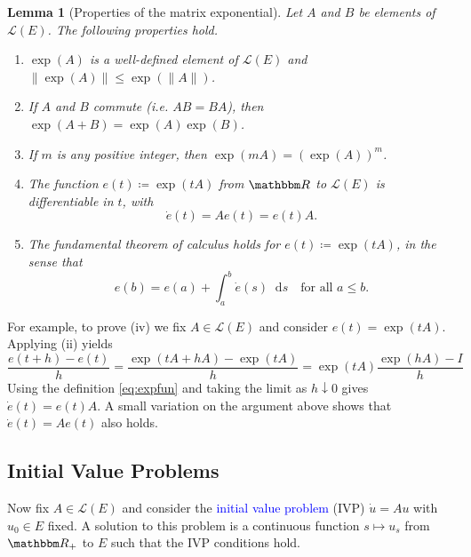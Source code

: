 \documentclass[12pt, reqno]{amsart}
\renewcommand{\leq}{\leqslant}
\newcommand{\1}{\mathbbm 1}
\newcommand*\diff{\mathop{}\!\mathrm{d}}
\newcommand{\lL}{\mathcal L}
\newcommand{\RR}{\mathbbm R}
\theoremstyle{plain}
\newtheorem{lemma}[theorem]{Lemma}
\theoremstyle{definition}
\newcommand{\navy}[1]{\textcolor{blue}{#1}}
\begin{document}
\begin{lemma}[Properties of the matrix exponential]\label{l:expcom}
    Let $A$ and $B$ be elements of $\lL(E)$.  The following properties hold.
    \begin{enumerate}
        \item $\exp(A)$ is a well-defined element of $\lL(E)$  and $\| \exp(A) \| \leq \exp(\|A\|)$.
        \item If $A$ and $B$ commute (i.e. $AB = BA$), then $\exp(A + B) =
            \exp(A) \exp(B)$.
        \item If $m$ is any positive integer, then $\exp(mA) = (\exp(A))^m$.
        \item The function $e(t) \coloneq \exp(tA)$ from $\RR$ to $\lL(E)$ is differentiable in $t$,
            with
            \begin{equation}\label{eq:matdiffl}
                \dot e(t) = A e(t) = e(t) A.
            \end{equation}
        \item The fundamental theorem of calculus holds for $e(t) \coloneq \exp(tA)$, in the sense that
            \begin{equation}\label{eq:ftcexp}
                e(b) 
                 = e(a) + \int_a^b \dot e(s) \diff s \quad \text{for all } a \leq b.
            \end{equation}
    \end{enumerate}
\end{lemma}

For example, to prove (iv) we fix $A \in \lL(E)$ and consider $e(t) = \exp(t
A)$. Applying (ii) yields
%
\begin{equation*}
    \frac{e(t + h) - e(t)}{h}
    = \frac{\exp(tA + hA) - \exp(tA)}{h}
    = \exp(tA) \frac{\exp(hA) - I}{h}
\end{equation*}
%
Using the definition \eqref{eq:expfun} and taking the limit as $h \downarrow
0$ gives $\dot e(t) = e(t) A $.  A small variation on the argument above
shows that $\dot e(t) = A e(t)$ also holds.


\subsection{Initial Value Problems}

Now fix $A \in \lL(E)$ and consider the \navy{initial value problem} (IVP) $\dot
u = A u$ with $u_0 \in E$ fixed.  A solution to this problem is a continuous
function $s \mapsto u_s$ from $\RR_+$ to $E$ such that the IVP conditions hold.
\end{document}
